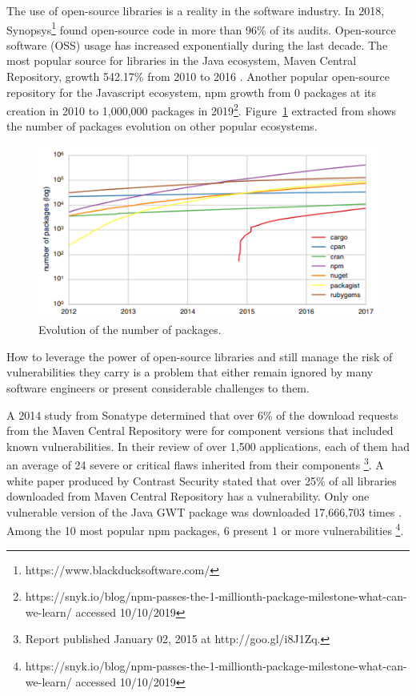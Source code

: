 \documentclass[pdf,bookmarks,colorlinks=true]{IEEEtran}
\begin{document}
The use of open-source libraries is a reality in the software industry. In 2018, Synopsys\footnote{https://www.blackducksoftware.com/} found open-source code in more than 96\% of its audits\cite{Synopsys2019}. Open-source software (OSS) usage has increased exponentially during the last decade. The most popular source for libraries in the Java ecosystem, Maven Central Repository, growth 542.17\% from 2010 to 2016 \cite{Kula2018}. Another popular open-source repository for the Javascript ecosystem, npm growth from 0 packages at its creation in 2010 to 1,000,000 packages in 2019\footnote{https://snyk.io/blog/npm-passes-the-1-millionth-package-milestone-what-can-we-learn/ accessed 10/10/2019}.   
Figure~\ref{PackageEvolution} extracted from \cite{Decan} shows the number of packages evolution on other popular ecosystems.
\begin{figure}[h]
	\centering
	\includegraphics[scale=0.70]{PackagesEvolution.png}
	\caption{Evolution of the number of packages.}
	\label{PackageEvolution}
\end{figure}
How to leverage the power of open-source libraries and still manage the risk of vulnerabilities they carry is a problem that either remain ignored by many software engineers or present considerable challenges to them.



A 2014 study from Sonatype determined that over 6\% of the download requests from the Maven Central Repository were for component versions that included known vulnerabilities. In their review of over 1,500 applications, each of them had an average of 24 severe or critical flaws inherited from their components \footnote{Report published January 02, 2015 at http://goo.gl/i8J1Zq.}.
A white paper produced by Contrast Security stated that over 25\% of all libraries downloaded from Maven Central Repository has a vulnerability. Only one vulnerable version of the Java GWT package was downloaded 17,666,703 times \cite{williams2012unfortunate}.
Among the 10 most popular npm packages, 6 present 1 or more vulnerabilities \footnote{https://snyk.io/blog/npm-passes-the-1-millionth-package-milestone-what-can-we-learn/ accessed 10/10/2019}.
\end{document}
